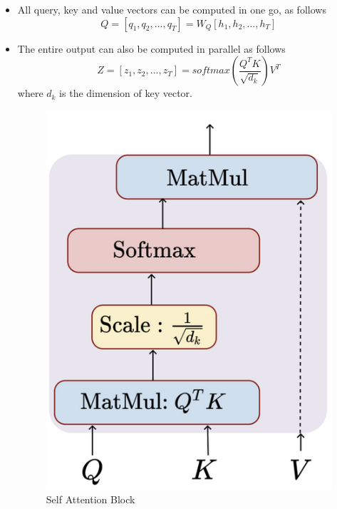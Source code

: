 \documentclass[a4paper]{article}
\begin{document}
\begin{itemize}
    \item All query, key and value vectors can be computed in one go, as follows
    \begin{equation*}
        Q=[q_1,q_2,...,q_T]=W_Q[h_1,h_2,...,h_T]
    \end{equation*}
    \item The entire output can also be computed in parallel as follows
    \begin{equation*}
        Z=[z_1,z_2,...,z_T]=softmax(\frac{Q^TK}{\sqrt{d_k}})V^T
    \end{equation*}
    where $d_k$ is the dimension of key vector.
    \begin{figure}[H]
        \centering
        \includegraphics[width=0.3\linewidth]{Degree//static/DL_self_attention_block.png}
        \caption{Self Attention Block}
    \end{figure}
\end{itemize}
\end{document}
